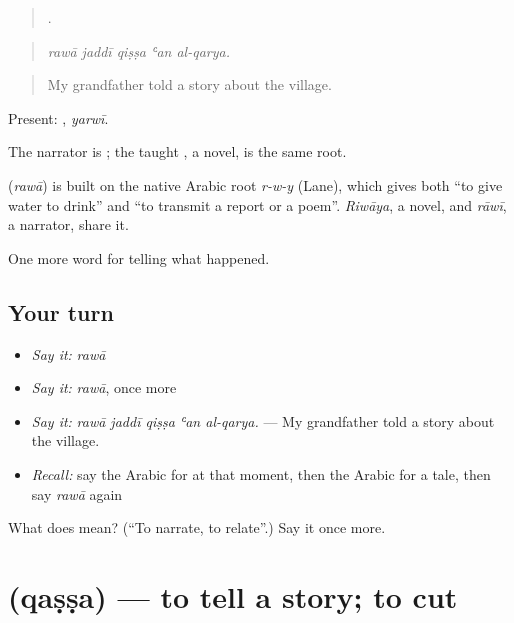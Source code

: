 \begin{quote}
    .
\end{quote}

\begin{quote}
\emph{rawā jaddī qiṣṣa ʿan al-qarya.}
\end{quote}

\begin{quote}
My grandfather told a story about the village.
\end{quote}

Present: , \emph{yarwī}.

The narrator is ; the taught , a novel, is the same root.

\begin{cousinweb}
\textbf{} (\emph{rawā}) is built on the native Arabic root \emph{r-w-y} (Lane), which gives both \textquotedblleft{}to give water to drink\textquotedblright{} and \textquotedblleft{}to transmit a report or a poem\textquotedblright{}. \emph{Riwāya}, a novel, and \emph{rāwī}, a narrator, share it.
\end{cousinweb}

\begin{grammarlens}[title={What you've built}]
One more word for telling what happened.
\end{grammarlens}

\subsection*{Your turn}
\begin{itemize}
\raggedright
  \item \emph{Say it:} \emph{rawā}
  \item \emph{Say it:} \emph{rawā}, once more
  \item \emph{Say it:} \emph{rawā jaddī qiṣṣa ʿan al-qarya.} — My grandfather told a story about the village.
  \item \emph{Recall:} say the Arabic for at that moment, then the Arabic for a tale, then say \emph{rawā} again
\end{itemize}

\begin{tcolorbox}[breakable,colback=teal!4,colframe=teal!35!black,title={Before you move on}]
What does  mean? (\textquotedblleft{}To narrate, to relate\textquotedblright{}.) Say it once more.
\end{tcolorbox}
\section[\texorpdfstring{\ar{قص} (qaṣṣa)}{قص (qaṣṣa)}]{ (qaṣṣa) — to tell a story; to cut}

